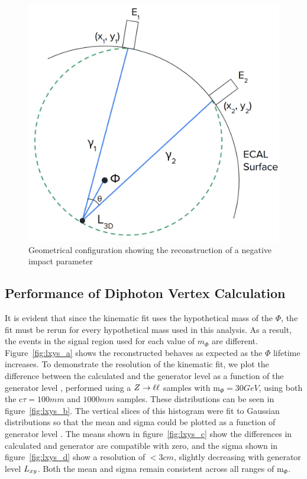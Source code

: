 \begin{figure}[htb]
	\centering
	\includegraphics[width=0.65\linewidth]{figs/05_analysis/vertexfit_diagram_negativeLxy.png}
	\caption{Geometrical configuration showing the reconstruction of a negative impact parameter}
	\label{fig:negLxy}
\end{figure}

\subsection{Performance of Diphoton Vertex Calculation}\label{sec:ana_vertex_results}
It is evident that since the kinematic fit uses the hypothetical mass of the $\Phi$, the fit must be rerun for every hypothetical mass used in this analysis. As a result, the events in the signal region used for each value of $m_\Phi$ are different. Figure~\ref{fig:lxys_a} shows the reconstructed \lxy behaves as expected as the $\Phi$ lifetime increases. To demonstrate the resolution of the kinematic fit, we plot the difference between the calculated \lxy and the generator level \lxy as a function of the generator level \lxy, performed using a $Z\to\ell\ell$ samples with m$_\Phi=30\unit{GeV}$, using both the c$\tau=100\unit{mm}$ and $1000\unit{mm}$ samples. These distributions can be seen in figure~\ref{fig:lxys_b}. The vertical slices of this histogram were fit to Gaussian distributions so that the mean and sigma could be plotted as a function of generator level \lxy. The means shown in figure~\ref{fig:lxys_c} show the differences in calculated and generator \lxy are compatible with zero, and the sigma shown in figure~\ref{fig:lxys_d} show a resolution of $<3\unit{cm}$, slightly decreasing with generator level $L_{xy}$. Both the mean and sigma remain consistent across all ranges of m$_\Phi$.

